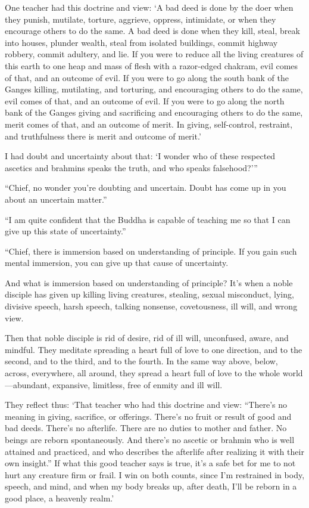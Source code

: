 \documentclass[12pt,openany]{book}%
\begin{document}
One teacher had this doctrine and view: ‘A bad deed is done by the doer when they punish, mutilate, torture, aggrieve, oppress, intimidate, or when they encourage others to do the same. A bad deed is done when they kill, steal, break into houses, plunder wealth, steal from isolated buildings, commit highway robbery, commit adultery, and lie. If you were to reduce all the living creatures of this earth to one heap and mass of flesh with a razor-edged chakram, evil comes of that, and an outcome of evil. If you were to go along the south bank of the Ganges killing, mutilating, and torturing, and encouraging others to do the same, evil comes of that, and an outcome of evil. If you were to go along the north bank of the Ganges giving and sacrificing and encouraging others to do the same, merit comes of that, and an outcome of merit. In giving, self-control, restraint, and truthfulness there is merit and outcome of merit.’ 

I had doubt and uncertainty about that: ‘I wonder who of these respected ascetics and brahmins speaks the truth, and who speaks falsehood?’” 

“Chief, no wonder you’re doubting and uncertain. Doubt has come up in you about an uncertain matter.” 

“I am quite confident that the Buddha is capable of teaching me so that I can give up this state of uncertainty.” 

“Chief, there is immersion based on understanding of principle. If you gain such mental immersion, you can give up that cause of uncertainty. 

And what is immersion based on understanding of principle? It’s when a noble disciple has given up killing living creatures, stealing, sexual misconduct, lying, divisive speech, harsh speech, talking nonsense, covetousness, ill will, and wrong view. 

Then that noble disciple is rid of desire, rid of ill will, unconfused, aware, and mindful. They meditate spreading a heart full of love to one direction, and to the second, and to the third, and to the fourth. In the same way above, below, across, everywhere, all around, they spread a heart full of love to the whole world—abundant, expansive, limitless, free of enmity and ill will. 

They reflect thus: ‘That teacher who had this doctrine and view: “There’s no meaning in giving, sacrifice, or offerings. There’s no fruit or result of good and bad deeds. There’s no afterlife. There are no duties to mother and father. No beings are reborn spontaneously. And there’s no ascetic or brahmin who is well attained and practiced, and who describes the afterlife after realizing it with their own insight.” If what this good teacher says is true, it’s a safe bet for me to not hurt any creature firm or frail. I win on both counts, since I’m restrained in body, speech, and mind, and when my body breaks up, after death, I’ll be reborn in a good place, a heavenly realm.’ 
\end{document}
